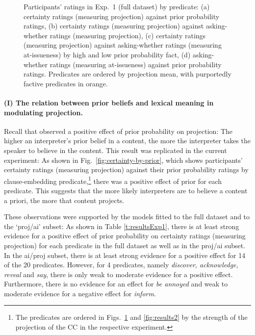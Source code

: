 \documentclass[11pt,fleqn]{article}
\newcommand{\6}{\mbox{$[\hspace*{-.6mm}[$}}
\newcommand{\9}{\mbox{$]\hspace*{-.6mm}]$}}
\begin{document}
\begin{figure}[h!]
\caption{Participants' ratings in Exp.~1 (full dataset) by predicate: (a) certainty ratings (measuring projection) against prior probability ratings, (b) certainty ratings (measuring projection) against asking-whether ratings (measuring projection), (c) certainty ratings (measuring projection) against asking-whether ratings (measuring at-issueness) by high and low prior probability fact, (d) asking-whether ratings (measuring at-issueness) against prior probability ratings. Predicates are ordered by projection mean, with purportedly factive predicates in orange.}\label{fig:results1}
\end{figure}

\paragraph{(I) The relation between prior beliefs and lexical meaning in modulating projection.} Recall that \citealt{degen-tonhauser-openmind} observed a positive effect of prior probability on projection: The higher an interpreter's prior belief in a content, the more the interpreter takes the speaker to believe in the content. This result was replicated in the current experiment: As shown in Fig.~\ref{fig:certainty-by-prior}, which shows participants' certainty ratings (measuring projection) against their prior probability ratings by clause-embedding predicate,\footnote{The predicates are ordered in Figs.~\ref{fig:results1} and \ref{fig:results2} by the strength of the projection of the CC in the respective experiment.} there was a positive effect of prior for each predicate. This suggests that the more likely interpreters are to believe a content a priori, the more that content projects.

These observations were supported by the models fitted to the full dataset and to the `proj/ai' subset: As shown in Table \ref{t:resultsExp1}, there is at least strong evidence for a positive effect of prior probability on certainty ratings (measuring projection) for each predicate in the full dataset as well as in the proj/ai subset. In the ai/proj subset, there is at least strong evidence for a positive effect for 14 of the 20 predicates. However, for 4 predicates, namely {\em discover, acknowledge, reveal} and {\em say}, there is only weak to moderate evidence for a positive effect. Furthermore, there is no evidence for an effect for {\em be annoyed} and weak to moderate evidence for a negative effect for {\em inform}. 
\end{document}
